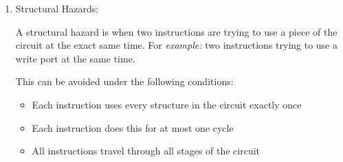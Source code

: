 \documentclass[12pt]{article}
\newenvironment{QandA}{\begin{enumerate}[label=\bfseries\alph*.]\bfseries}
                      {\end{enumerate}}
\newenvironment{answered}{\par\quad\normalfont}{}
\begin{document}
\begin{QandA}
    \item Structural Hazards:
    \begin{answered}
        A structural hazard is when two instructions are trying to use a piece of the circuit at the exact same time. For \textit{example:} two instructions trying to use a write port at the same time. 
        
        This can be avoided under the following conditions:
        \begin{itemize}
            \item Each instruction uses every structure in the circuit exactly once
            \item Each instruction does this for at most one cycle
            \item All instructions travel through all stages of the circuit
        \end{itemize}
    \end{answered}

\end{QandA}
\end{document}
